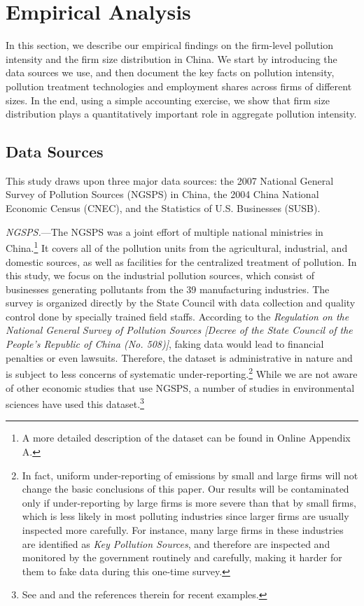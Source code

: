 \documentclass[AEJ]{AEA}
\begin{document}
\section{Empirical Analysis}

In this section, we describe our empirical findings on the firm-level pollution intensity and the firm size distribution in China. We start by introducing the data sources we use, and then document the key facts on pollution intensity, pollution treatment technologies and employment shares across firms of different sizes. In the end, using a simple accounting exercise, we show that firm size distribution plays a quantitatively important role in aggregate pollution intensity.

\subsection{Data Sources}
\label{sec:data_source}

This study draws upon three major data sources: the 2007 National General Survey of Pollution Sources (NGSPS) in China, the 2004 China National Economic Census (CNEC), and the Statistics of U.S. Businesses (SUSB).

\textit{NGSPS.}---The NGSPS was a joint effort of multiple national ministries in China.\footnote{A more detailed description of the dataset can be found in Online Appendix A.} It covers all of the pollution units from the agricultural, industrial, and domestic sources, as well as facilities for the centralized treatment of pollution. In this study, we focus on the {industrial pollution sources}, which consist of businesses generating pollutants from the 39 manufacturing industries. The survey is organized directly by the State Council with data collection and quality control done by specially trained field staffs. According to the \textit{Regulation on the National General Survey of Pollution Sources [Decree of the State Council of the People's Republic of China (No. 508)]}, faking data would lead to financial penalties or even lawsuits. Therefore, the dataset is administrative in nature and is subject to less concerns of systematic under-reporting.\footnote{In fact, uniform under-reporting of emissions by small and large firms will not change the basic conclusions of this paper. Our results will be contaminated only if under-reporting by large firms is more severe than that by small firms, which is less likely in most polluting industries since larger firms are usually inspected more carefully. For instance, many large firms in these industries are identified as \textit{Key Pollution Sources}, and therefore are inspected and monitored by the government routinely and carefully, making it harder for them to fake data during this one-time survey.} While we are not aware of other economic studies that use NGSPS, a number of studies in environmental sciences have used this dataset.\footnote{See \citet{Niuetal:2016} and \citet{Qietal:2017} and the references therein for recent examples.}
\end{document}
